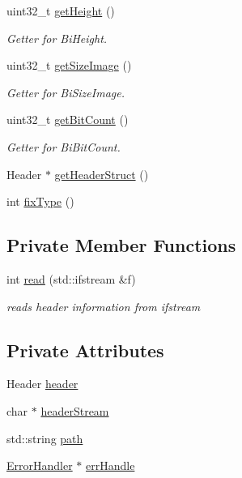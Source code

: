 \begin{DoxyCompactItemize}
uint32\+\_\+t \mbox{\hyperlink{classBitmapHeader_a106f72d6c256327342029edf8e18bde1}{get\+Height}} ()
\begin{DoxyCompactList}\small\item\em Getter for Bi\+Height. \end{DoxyCompactList}\item 
uint32\+\_\+t \mbox{\hyperlink{classBitmapHeader_aa55f157d6852ce35add8c5db54ccadae}{get\+Size\+Image}} ()
\begin{DoxyCompactList}\small\item\em Getter for Bi\+Size\+Image. \end{DoxyCompactList}\item 
uint32\+\_\+t \mbox{\hyperlink{classBitmapHeader_a2660782990f1d9547e0aef501f666969}{get\+Bit\+Count}} ()
\begin{DoxyCompactList}\small\item\em Getter for Bi\+Bit\+Count. \end{DoxyCompactList}\item 
Header $\ast$ \mbox{\hyperlink{classBitmapHeader_a7ac69b70fce7b54c9cd3134a0e68ea58}{get\+Header\+Struct}} ()
\item 
int \mbox{\hyperlink{classBitmapHeader_aa02e59db95074c6a96a44dac03cee77b}{fix\+Type}} ()
\end{DoxyCompactItemize}
\subsection*{Private Member Functions}
\begin{DoxyCompactItemize}
\item 
int \mbox{\hyperlink{classBitmapHeader_aebc19bf8a908f1f7edfc5b10186c9db8}{read}} (std\+::ifstream \&f)
\begin{DoxyCompactList}\small\item\em reads header information from ifstream \end{DoxyCompactList}\end{DoxyCompactItemize}
\subsection*{Private Attributes}
\begin{DoxyCompactItemize}
\item 
Header \mbox{\hyperlink{classBitmapHeader_ab1e2a2c32e87d647977bbd3e700f2265}{header}}
\item 
char $\ast$ \mbox{\hyperlink{classBitmapHeader_a9109a897251733f77942008318482426}{header\+Stream}}
\item 
std\+::string \mbox{\hyperlink{classBitmapHeader_a928111fbaf59eebf24b750cbca11c5dd}{path}}
\item 
\mbox{\hyperlink{classErrorHandler}{Error\+Handler}} $\ast$ \mbox{\hyperlink{classBitmapHeader_ab06f141245d592302dabe48571d12e32}{err\+Handle}}
\end{DoxyCompactItemize}


